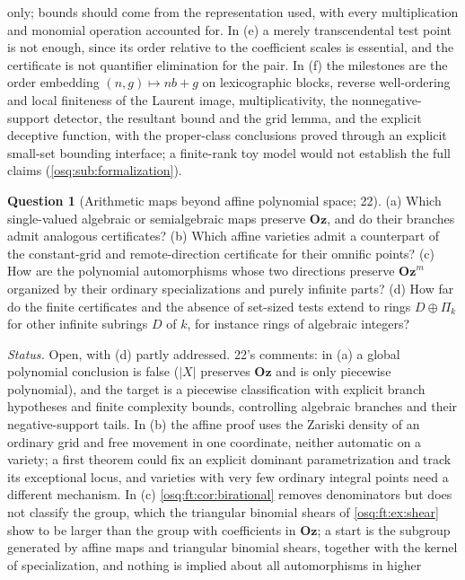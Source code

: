 \documentclass[11pt,letterpaper]{article}
\numberwithin{equation}{section}
\theoremstyle{definition}
\newtheorem{question}[question]{Question}
\theoremstyle{remark}
\theoremstyle{plain}
\newcommand{\Oz}{\mathbf{Oz}}
\begin{document}
only; bounds should come from the representation used, with every multiplication and monomial operation accounted for. In (e) a merely
transcendental test point is not enough, since its order relative to the coefficient scales is essential, and the certificate is not quantifier
elimination for the pair. In (f) the milestones are the order embedding $(n,g)\mapsto nb+g$ on lexicographic blocks, reverse well-ordering and local
finiteness of the Laurent image, multiplicativity, the nonnegative-support detector, the resultant bound and the grid lemma, and the explicit deceptive
function, with the proper-class conclusions proved through an explicit small-set bounding interface; a finite-rank toy model would not establish the
full claims (\cref{osq:sub:formalization}).

\begin{question}[Arithmetic maps beyond affine polynomial space; 22]\label{osq:ft:q:maps}
(a) Which single-valued algebraic or semialgebraic maps preserve $\Oz$, and do their branches admit analogous certificates? (b) Which affine
varieties admit a counterpart of the constant-grid and remote-direction certificate for their omnific points? (c) How are the polynomial
automorphisms whose two directions preserve $\Oz^m$ organized by their ordinary specializations and purely infinite parts? (d) How far do the
finite certificates and the absence of set-sized tests extend to rings $D\oplus\Pi_k$ for other infinite subrings $D$ of $k$, for instance rings of
algebraic integers?
\end{question}
\emph{Status.} Open, with (d) partly addressed. 22's comments: in (a) a global polynomial conclusion is false ($|X|$ preserves $\Oz$ and is only
piecewise polynomial), and the target is a piecewise classification with explicit branch hypotheses and finite complexity bounds, controlling algebraic
branches and their negative-support tails. In (b) the affine proof uses the Zariski density of an ordinary grid and free movement in one coordinate,
neither automatic on a variety; a first theorem could fix an explicit dominant parametrization and track its exceptional locus, and varieties with very
few ordinary integral points need a different mechanism. In (c) \cref{osq:ft:cor:birational} removes denominators but does not classify the group, which
the triangular binomial shears of \cref{osq:ft:ex:shear} show to be larger than the group with coefficients in $\Oz$; a start is the subgroup generated
by affine maps and triangular binomial shears, together with the kernel of specialization, and nothing is implied about all automorphisms in higher
\end{document}
